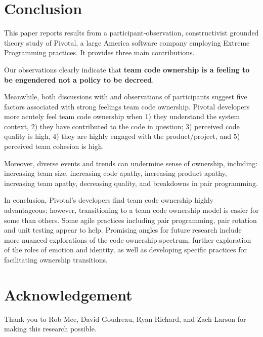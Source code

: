 \section{Conclusion}
\label{Conclusion}
This paper reports results from a participant-observation, constructivist grounded theory study of Pivotal, a large America software company employing Extreme Programming practices. It provides three main contributions.

Our observations clearly indicate that \textbf{team code ownership is a feeling to be engendered not a policy to be decreed}.

Meanwhile, both discussions with and observations of participants suggest five factors associated with strong feelings team code ownership. Pivotal developers more acutely feel team code ownership when 1) they understand the system context, 2) they have contributed to the code in question; 3) perceived code quality is high, 4) they are highly engaged with the product/project, and 5) perceived team cohesion is high.   

Moreover, diverse events and trends can undermine sense of ownership, including:  increasing team size, increasing code apathy, increasing product apathy, increasing team apathy, decreasing quality, and breakdowns in pair programming. 

In conclusion, Pivotal's developers find team code ownership highly advantageous; however, transitioning to a team code ownership model is easier for some than others. Some agile practices including pair programming, pair rotation and unit testing appear to help. Promising angles for future research include more nuanced explorations of the code ownership spectrum, further exploration of the roles of emotion and identity, as well as developing specific practices for facilitating ownership transitions. 

\section{Acknowledgement}
Thank you to Rob Mee, David Goudreau, Ryan Richard, and Zach Larson for making this research possible.



